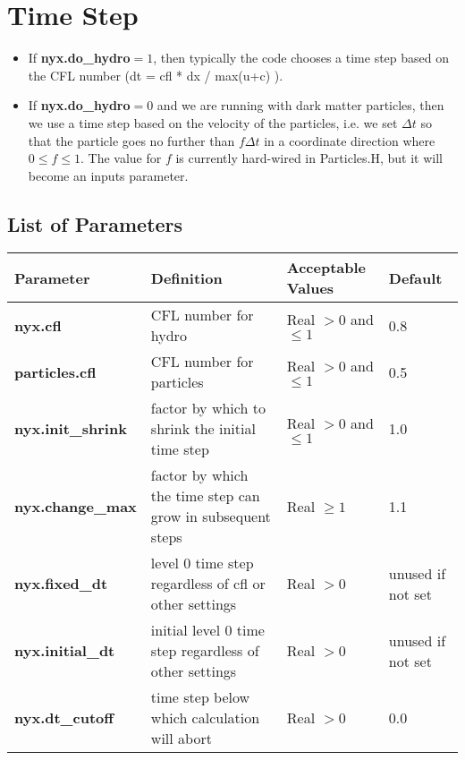 \section{Time Step}
\begin{itemize}
\item If {\bf nyx.do\_hydro}$ = 1$, then typically 
the code chooses a time step based on the CFL number (dt = cfl * dx / max(u+c) ).

\item If {\bf nyx.do\_hydro}$ = 0$ and we are running with dark matter particles, then we use a time step
based on the velocity of the particles, i.e. we set $\Delta t$ so that the particle goes no further than
$f \Delta t$ in a coordinate direction where $0 \leq f \leq 1.$   The value for $f$ is currently hard-wired
in Particles.H, but it will become an inputs parameter.
\end{itemize}

\subsection{List of Parameters}

\begin{table*}[h]
\begin{scriptsize}
\begin{center}
\begin{tabular}{|l|l|l|l|} \hline
Parameter & Definition & Acceptable Values &Default\\
\hline
{\bf nyx.cfl}    & CFL number for hydro    & Real $> 0$ and $\leq 1$ & 0.8 \\ 
{\bf particles.cfl} & CFL number for particles& Real $> 0$ and $\leq 1$ & 0.5 \\ 
{\bf nyx.init\_shrink} & factor by which to shrink the initial time step & Real $> 0$ and $\leq 1$ & 1.0 \\ 
{\bf nyx.change\_max} & factor by which the time step can grow in subsequent steps & Real $\geq 1$ & 1.1 \\ 
{\bf nyx.fixed\_dt} &  level 0 time step regardless of cfl or other settings & Real $> 0$ & unused if not set \\
{\bf nyx.initial\_dt} &  initial level 0 time step regardless of other settings & Real $> 0$ & unused if not set \\
{\bf nyx.dt\_cutoff} & time step below which calculation will abort & Real $> 0$ & 0.0 \\
\hline
\end{tabular}
\label{Table:TimeStepInputs}
\end{center}
\end{scriptsize}
\end{table*}

